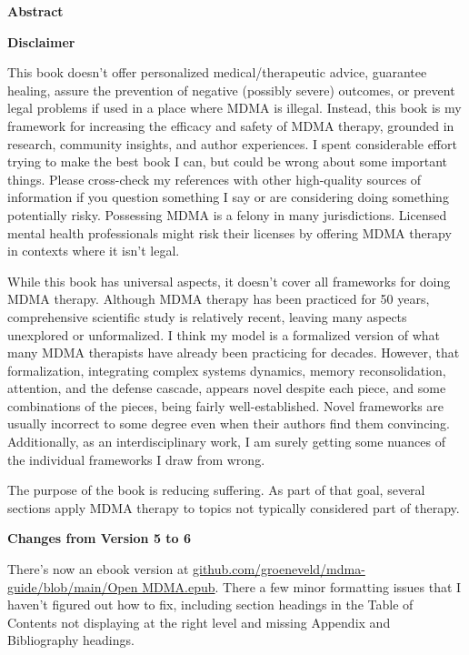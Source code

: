 \documentclass[11pt,oneside]{book}
\newcommand{\frontsection}[1]{%
  \par\vspace{2\baselineskip}%
  {\centering\sffamily\bfseries\large #1\par}%
  \nopagebreak\vspace{\baselineskip}%
}
\begin{document}
\newpage

\frontsection{Abstract}

\clearpage

\newpage

\frontsection{Disclaimer}
This book doesn't offer personalized medical/therapeutic advice, guarantee healing, assure the prevention of negative (possibly severe) outcomes, or prevent legal problems if used in a place where MDMA is illegal. Instead, this book is my framework for increasing the efficacy and safety of MDMA therapy, grounded in research, community insights, and author experiences. I spent considerable effort trying to make the best book I can, but could be wrong about some important things. Please cross-check my references with other high-quality sources of information if you question something I say or are considering doing something potentially risky. Possessing MDMA is a felony in many jurisdictions. Licensed mental health professionals might risk their licenses by offering MDMA therapy in contexts where it isn't legal.

While this book has universal aspects, it doesn't cover all frameworks for doing MDMA therapy. Although MDMA therapy has been practiced for 50 years, comprehensive scientific study is relatively recent, leaving many aspects unexplored or unformalized. I think my model is a formalized version of what many MDMA therapists have already been practicing for decades. However, that formalization, integrating complex systems dynamics, memory reconsolidation, attention, and the defense cascade, appears novel despite each piece, and some combinations of the pieces, being fairly well-established. Novel frameworks are usually incorrect to some degree even when their authors find them convincing. Additionally, as an interdisciplinary work, I am surely getting some nuances of the individual frameworks I draw from wrong.

The purpose of the book is reducing suffering. As part of that goal, several sections apply MDMA therapy to topics not typically considered part of therapy.

\clearpage

\newpage

\frontsection{Changes from Version 5 to 6}
There's now an ebook version at \href{https://github.com/groeneveld/mdma-guide/blob/main/Open%20MDMA.epub}{github.com/groeneveld/mdma-guide/blob/main/Open MDMA.epub}. There a few minor formatting issues that I haven't figured out how to fix, including section headings in the Table of Contents not displaying at the right level and missing Appendix and Bibliography headings.
\end{document}
